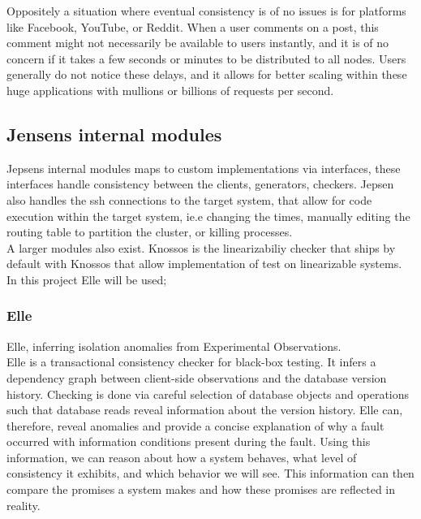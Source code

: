 \documentclass[a4paper,10pt,titlepage]{report}
\begin{document}
Oppositely a situation where eventual consistency is of no issues is for platforms like Facebook, YouTube, or Reddit. When a user comments on a post, this comment might not necessarily be available to users instantly, and it is of no concern if it takes a few seconds or minutes to be distributed to all nodes. Users generally do not notice these delays, and it allows for better scaling within these huge applications with mullions or billions of requests per second.



\subsection{Jensens internal modules}
Jepsens internal modules maps to custom implementations via interfaces, these interfaces handle consistency between the clients, generators, checkers. Jepsen also handles the ssh connections to the target system, that allow for code execution within the target system, ie.e changing the times, manually editing the routing table to partition the cluster, or killing processes.\\

A larger modules also exist. Knossos \cite{Knossos} is the linearizabiliy checker that ships by default with Knossos that allow implementation of test on linearizable systems. In this project Elle will be used;

\subsubsection{Elle}
Elle, \cite{elle} inferring isolation anomalies from Experimental Observations. \\

Elle is a transactional consistency checker for black-box testing. It infers a dependency graph between client-side observations and the database version history. Checking is done via careful selection of database objects and operations such that database reads reveal information about the version history. Elle can, therefore, reveal anomalies and provide a concise explanation of why a fault occurred with information conditions present during the fault. Using this information, we can reason about how a system behaves, what level of consistency it exhibits, and which behavior we will see. This information can then compare the promises a system makes and how these promises are reflected in reality.\\
\vspace{5mm}
\end{document}
